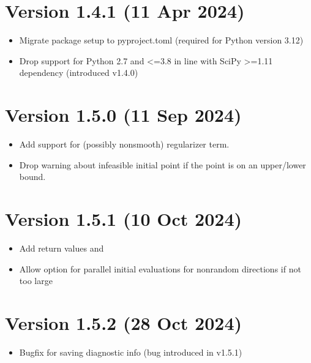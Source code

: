 \documentclass[letterpaper,10pt,english]{sphinxmanual}
\begin{document}
\section{Version 1.4.1 (11 Apr 2024)}
\label{\detokenize{history:version-1-4-1-11-apr-2024}}\begin{itemize}
\item {} 
\sphinxAtStartPar
Migrate package setup to pyproject.toml (required for Python version 3.12)

\item {} 
\sphinxAtStartPar
Drop support for Python 2.7 and \textless{}=3.8 in line with SciPy \textgreater{}=1.11 dependency (introduced v1.4.0)

\end{itemize}


\section{Version 1.5.0 (11 Sep 2024)}
\label{\detokenize{history:version-1-5-0-11-sep-2024}}\begin{itemize}
\item {} 
\sphinxAtStartPar
Add support for (possibly nonsmooth) regularizer term.

\item {} 
\sphinxAtStartPar
Drop warning about infeasible initial point if the point is on an upper/lower bound.

\end{itemize}


\section{Version 1.5.1 (10 Oct 2024)}
\label{\detokenize{history:version-1-5-1-10-oct-2024}}\begin{itemize}
\item {} 
\sphinxAtStartPar
Add return values  and 

\item {} 
\sphinxAtStartPar
Allow option for parallel initial evaluations for non\sphinxhyphen{}random directions if  not too large

\end{itemize}


\section{Version 1.5.2 (28 Oct 2024)}
\label{\detokenize{history:version-1-5-2-28-oct-2024}}\begin{itemize}
\item {} 
\sphinxAtStartPar
Bugfix for saving diagnostic info (bug introduced in v1.5.1)

\end{itemize}
\end{document}
